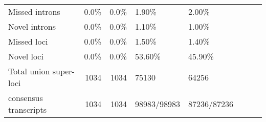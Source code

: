 \documentclass[11pt]{article}
\begin{document}
\begin{center}
\begin{tabular}{lrrlllll}
 Missed introns          &      0.0\%  &      0.0\%  &  1.90\%       &  2.00\%       &     &     &     \\
 Novel introns           &      0.0\%  &      0.0\%  &  1.10\%       &  1.00\%       &     &     &     \\
 Missed loci             &      0.0\%  &      0.0\%  &  1.50\%       &  1.40\%       &     &     &     \\
 Novel loci              &      0.0\%  &      0.0\%  &  53.60\%      &  45.90\%      &     &     &     \\
 Total union super-loci  &       1034  &       1034  &  75130        &  64256        &     &     &     \\
 consensus transcripts   &       1034  &       1034  &  98983/98983  &  87236/87236  &     &     &     \\
\end{tabular}
\end{center}
\end{document}
